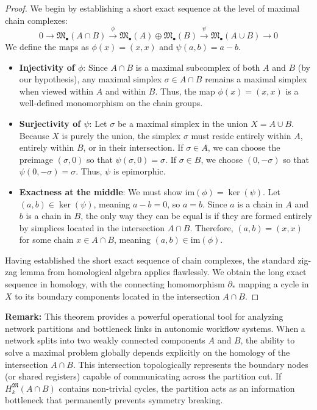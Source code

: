 \begin{proof}
We begin by establishing a short exact sequence at the level of maximal chain complexes:
\[
0 \to \mathfrak{M}_\bullet(A \cap B) \xrightarrow{\phi} \mathfrak{M}_\bullet(A) \oplus \mathfrak{M}_\bullet(B) \xrightarrow{\psi} \mathfrak{M}_\bullet(A \cup B) \to 0
\]
We define the maps as $\phi(x) = (x, x)$ and $\psi(a, b) = a - b$. 

\begin{itemize}
    \item \textbf{Injectivity of $\phi$}: Since $A \cap B$ is a maximal subcomplex of both $A$ and $B$ (by our hypothesis), any maximal simplex $\sigma \in A \cap B$ remains a maximal simplex when viewed within $A$ and within $B$. Thus, the map $\phi(x) = (x,x)$ is a well-defined monomorphism on the chain groups.
    \item \textbf{Surjectivity of $\psi$}: Let $\sigma$ be a maximal simplex in the union $X = A \cup B$. Because $X$ is purely the union, the simplex $\sigma$ must reside entirely within $A$, entirely within $B$, or in their intersection. If $\sigma \in A$, we can choose the preimage $(\sigma, 0)$ so that $\psi(\sigma, 0) = \sigma$. If $\sigma \in B$, we choose $(0, -\sigma)$ so that $\psi(0, -\sigma) = \sigma$. Thus, $\psi$ is epimorphic.
    \item \textbf{Exactness at the middle}: We must show $\text{im}(\phi) = \ker(\psi)$. Let $(a,b) \in \ker(\psi)$, meaning $a - b = 0$, so $a = b$. Since $a$ is a chain in $A$ and $b$ is a chain in $B$, the only way they can be equal is if they are formed entirely by simplices located in the intersection $A \cap B$. Therefore, $(a,b) = (x,x)$ for some chain $x \in A \cap B$, meaning $(a,b) \in \text{im}(\phi)$. 
\end{itemize}

Having established the short exact sequence of chain complexes, the standard zig-zag lemma from homological algebra applies flawlessly. We obtain the long exact sequence in homology, with the connecting homomorphism $\partial_*$ mapping a cycle in $X$ to its boundary components located in the intersection $A \cap B$.
\end{proof}

\textbf{Remark:} This theorem provides a powerful operational tool for analyzing network partitions and bottleneck links in autonomic workflow systems. When a network splits into two weakly connected components $A$ and $B$, the ability to solve a maximal problem globally depends explicitly on the homology of the intersection $A \cap B$. This intersection topologically represents the boundary nodes (or shared registers) capable of communicating across the partition cut. If $H_k^{\mathfrak{M}}(A \cap B)$ contains non-trivial cycles, the partition acts as an information bottleneck that permanently prevents symmetry breaking.

